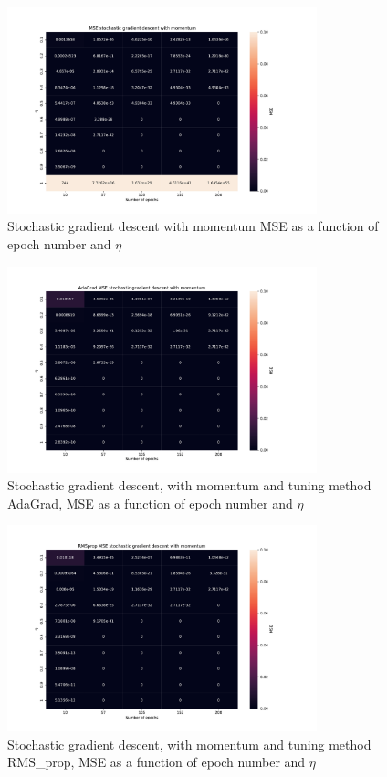 \begin{figure}[H]
\centering
\includegraphics[width=0.8\textwidth]{Figures/PartA/_sgdm_MSE(eta,epochs)}
\caption{Stochastic gradient descent with momentum MSE as a function of epoch number and \(\eta \)	 }
\label{fig:_sgdm_MSE-eta-epochs-}
\end{figure}

\begin{figure}[H]
\centering
\includegraphics[width=0.8\textwidth]{Figures/PartA/AdaGrad_sgdm_MSE(eta,epochs)}
\caption{Stochastic gradient descent, with momentum and tuning method AdaGrad, MSE as a function of epoch number and \(\eta \)	 }
\label{fig:AdaGrad_sgdm_MSE-eta-epochs-}
\end{figure}

\begin{figure}[H]
\centering
\includegraphics[width=0.8\textwidth]{Figures/PartA/RMSprop_sgdm_MSE(eta,epochs)}
\caption{Stochastic gradient descent, with momentum and tuning method RMS\_prop, MSE as a function of epoch number and \(\eta \)	 }
\label{fig:RMSprop_sgdm_MSE-eta-epochs-}
\end{figure}

